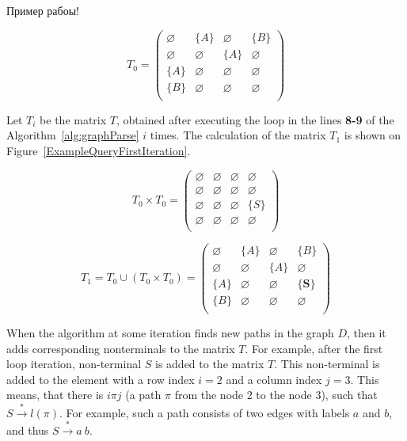 \begin{example} Пример рабоы!


\[
T_0 = \begin{pmatrix}
    \varnothing & \{A\}       & \varnothing & \{B\}       \\
    \varnothing & \varnothing & \{A\}       & \varnothing \\
    \{A\}       & \varnothing & \varnothing & \varnothing \\
    \{B\}       & \varnothing & \varnothing & \varnothing \\
\end{pmatrix}
\]

Let $T_i$ be the matrix $T$, obtained after executing the loop in the lines \textbf{8-9} of the Algorithm~\ref{alg:graphParse} $i$ times. The calculation of the matrix $T_1$ is shown on Figure~\ref{ExampleQueryFirstIteration}.


\[
T_0 \times T_0 = \begin{pmatrix}
    \varnothing & \varnothing & \varnothing & \varnothing \\
    \varnothing & \varnothing & \varnothing & \varnothing \\
    \varnothing & \varnothing & \varnothing & \{S\}       \\
    \varnothing & \varnothing & \varnothing & \varnothing \\
\end{pmatrix}
\]

\[
T_1 = T_0 \cup (T_0 \times T_0) = \begin{pmatrix}
    \varnothing & \{A\}       & \varnothing & \{B\}       \\
    \varnothing & \varnothing & \{A\}       & \varnothing \\
    \{A\}       & \varnothing & \varnothing & \{\pmb{S}\}       \\
    \{B\}       & \varnothing & \varnothing & \varnothing \\
\end{pmatrix}
\]

When the algorithm at some iteration finds new paths in the graph $D$, then it adds corresponding nonterminals to the matrix $T$. For example, after the first loop iteration, non-terminal $S$ is added to the matrix $T$. This non-terminal is added to the element with a row index $i = 2$ and a column index $j = 3$. This means, that there is $i\pi j$ (a path $\pi$ from the node 2 to the node 3), such that $S \xrightarrow{*} l(\pi)$. For example, such a path consists of two edges with labels $a$ and $b$, and thus $S \xrightarrow{*} a \ b$.


\end{example}
